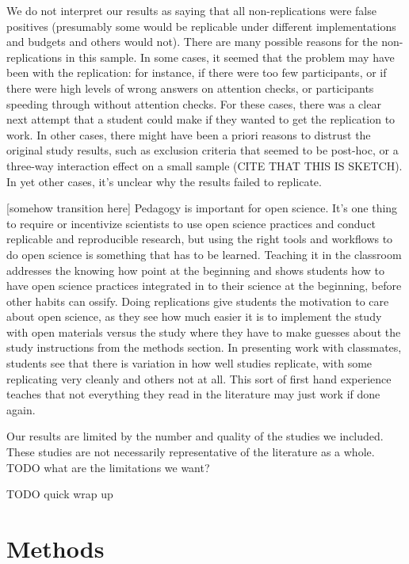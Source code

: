 \documentclass[
  english,
  a4paper,
]{article}
\begin{document}
We do not interpret our results as saying that all non-replications were false positives (presumably some would be replicable under different implementations and budgets and others would not). There are many possible reasons for the non-replications in this sample. In some cases, it seemed that the problem may have been with the replication: for instance, if there were too few participants, or if there were high levels of wrong answers on attention checks, or participants speeding through without attention checks. For these cases, there was a clear next attempt that a student could make if they wanted to get the replication to work. In other cases, there might have been a priori reasons to distrust the original study results, such as exclusion criteria that seemed to be post-hoc, or a three-way interaction effect on a small sample (CITE THAT THIS IS SKETCH). In yet other cases, it's unclear why the results failed to replicate.

{[}somehow transition here{]} Pedagogy is important for open science. It's one thing to require or incentivize scientists to use open science practices and conduct replicable and reproducible research, but using the right tools and workflows to do open science is something that has to be learned. Teaching it in the classroom addresses the knowing how point at the beginning and shows students how to have open science practices integrated in to their science at the beginning, before other habits can ossify. Doing replications give students the motivation to care about open science, as they see how much easier it is to implement the study with open materials versus the study where they have to make guesses about the study instructions from the methods section. In presenting work with classmates, students see that there is variation in how well studies replicate, with some replicating very cleanly and others not at all. This sort of first hand experience teaches that not everything they read in the literature may just work if done again.

Our results are limited by the number and quality of the studies we included. These studies are not necessarily representative of the literature as a whole. TODO what are the limitations we want?

TODO quick wrap up

\hypertarget{methods}{%
\section{Methods}\label{methods}}
\end{document}
